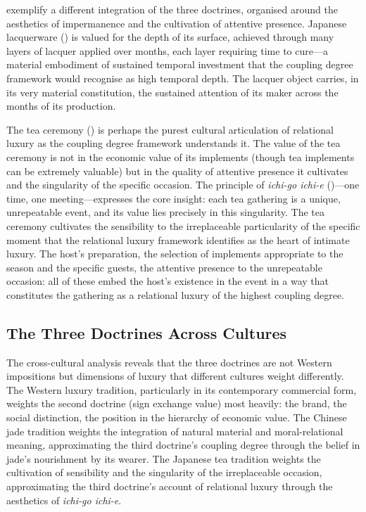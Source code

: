  exemplify a different integration of the three doctrines, organised around the aesthetics of impermanence and the cultivation of attentive presence. Japanese lacquerware () is valued for the depth of its surface, achieved through many layers of lacquer applied over months, each layer requiring time to cure---a material embodiment of sustained temporal investment that the coupling degree framework would recognise as high temporal depth. The lacquer object carries, in its very material constitution, the sustained attention of its maker across the months of its production.

The tea ceremony () is perhaps the purest cultural articulation of relational luxury as the coupling degree framework understands it. The value of the tea ceremony is not in the economic value of its implements (though tea implements can be extremely valuable) but in the quality of attentive presence it cultivates and the singularity of the specific occasion. The principle of \emph{ichi-go ichi-e} ()---one time, one meeting---expresses the core insight: each tea gathering is a unique, unrepeatable event, and its value lies precisely in this singularity. The tea ceremony cultivates the sensibility to the irreplaceable particularity of the specific moment that the relational luxury framework identifies as the heart of intimate luxury. The host's preparation, the selection of implements appropriate to the season and the specific guests, the attentive presence to the unrepeatable occasion: all of these embed the host's existence in the event in a way that constitutes the gathering as a relational luxury of the highest coupling degree.

\subsection{The Three Doctrines Across Cultures}
\label{p16:subsec:doctrines_cultures}

\noindent
The cross-cultural analysis reveals that the three doctrines are not Western impositions but dimensions of luxury that different cultures weight differently. The Western luxury tradition, particularly in its contemporary commercial form, weights the second doctrine (sign exchange value) most heavily: the brand, the social distinction, the position in the hierarchy of economic value. The Chinese jade tradition weights the integration of natural material and moral-relational meaning, approximating the third doctrine's coupling degree through the belief in jade's nourishment by its wearer. The Japanese tea tradition weights the cultivation of sensibility and the singularity of the irreplaceable occasion, approximating the third doctrine's account of relational luxury through the aesthetics of \emph{ichi-go ichi-e}.

